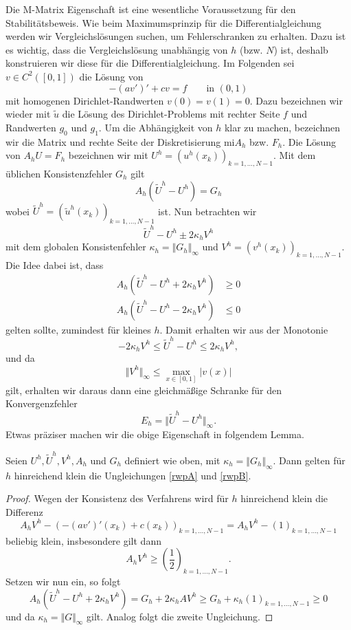 Die M-Matrix Eigenschaft ist eine wesentliche Voraussetzung f\"ur den Stabilitätsbeweis. Wie beim Maximumsprinzip für die Differentialgleichung werden wir Vergleichsl\"osungen suchen, um Fehlerschranken zu erhalten. Dazu ist es wichtig, dass die Vergleichsl\"osung unabh\"angig von $h$ (bzw. $N$) ist, deshalb konstruieren wir diese f\"ur die Differentialgleichung. Im Folgenden sei $v \in C^2([0,1])$ die L\"osung von 
$$ - (av')' +c v = f \qquad \text{in }(0,1)$$
mit homogenen Dirichlet-Randwerten $v(0)=v(1)=0$. Dazu bezeichnen wir wieder mit $\tilde u$ die L\"osung des Dirichlet-Problems mit rechter Seite $f$ und Randwerten $g_0$ und $g_1$. Um die Abh\"angigkeit von $h$ klar zu machen, bezeichnen wir die Matrix und rechte Seite der Diskretisierung mi$ A_h$ bzw. $F_h$. Die L\"osung von $A_h U = F_h$ bezeichnen wir mit $U^h = (u^h(x_k))_{k=1,\ldots,N-1}$. Mit dem \"ublichen Konsistenzfehler $G_h$ gilt
$$ A_h (\tilde U^h - U^h) = G_h$$
wobei   $\tilde U^h = (\tilde u^h(x_k))_{k=1,\ldots,N-1}$ ist. Nun betrachten wir 
$$ \tilde U^h - U^h \pm 2 \kappa_h V^h$$
mit dem globalen Konsistenfehler $\kappa_h = \Vert G_h  \Vert_\infty$ und  $V^h = (v^h(x_k))_{k=1,\ldots,N-1}$.
Die Idee dabei ist, dass
\begin{align}
	A_h (\tilde U^h - U^h+2 \kappa_h V^h) &\geq 0 \label{rwpA} \\
	A_h (\tilde U^h - U^h-2 \kappa_h V^h) &\leq 0 \label{rwpB}
\end{align}
gelten sollte, zumindest f\"ur kleines $h$. Damit erhalten wir aus der Monotonie 
$$ - 2  \kappa_h V^h \leq \tilde U^h - U^h \leq  2 \kappa_h V^h, $$
und da 
$$ \Vert V^h \Vert_\infty \leq \max_{x \in [0,1]} \vert v(x) \vert $$
gilt, erhalten wir daraus dann eine gleichmäßige Schranke f\"ur den Konvergenzfehler
$$ E_h = \Vert \tilde U^h - U^h \Vert_\infty. $$
Etwas präziser machen wir die obige Eigenschaft in folgendem Lemma.
\begin{lemma}{}{}
Seien $U^h, \tilde U^h, V^h, A_h$ und $G_h$ definiert wie oben, mit $\kappa_h = \Vert G_h  \Vert_\infty$.
Dann gelten f\"ur $h$ hinreichend klein die Ungleichungen \eqref{rwpA} und \eqref{rwpB}.
\end{lemma}
\begin{proof}
Wegen der Konsistenz des Verfahrens wird f\"ur $h$ hinreichend klein die Differenz
$$ A_h V^h - (-(av')'(x_k) + c(x_k))_{k=1,\ldots,N-1}  = A_h V^h - (1)_{k=1,\ldots,N-1} $$
beliebig klein, insbesondere gilt dann 
$$ A_h V^h \geq (\frac{1}2)_{k=1,\ldots,N-1}. $$
Setzen wir nun ein, so folgt 
$$ A_h (\tilde U^h - U^h+2 \kappa_h V^h) = G_h + 2 \kappa_h A   V^h \geq G_h + \kappa_h (1)_{k=1,\ldots,N-1} \geq 0
$$ 
und da $\kappa_h = \Vert G \Vert_\infty$ gilt. Analog folgt die zweite Ungleichung.
\end{proof}


